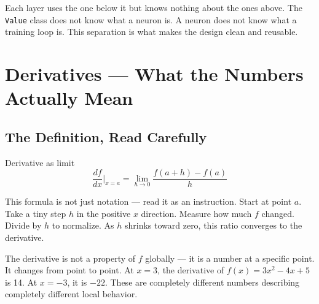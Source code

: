 \documentclass[12pt,a4paper]{article}
\newcommand{\code}[1]{\texttt{\small\color{deepblue}#1}}
\begin{document}
\begin{center}
\end{center}

Each layer uses the one below it but knows nothing about the ones above. The \code{Value} class does not know what a neuron is. A neuron does not know what a training loop is. This separation is what makes the design clean and reusable.

\section{Derivatives — What the Numbers Actually Mean}

\subsection{The Definition, Read Carefully}

\begin{mathbox}{Derivative as limit}
\[
\frac{df}{dx}\bigg|_{x=a} = \lim_{h \to 0} \frac{f(a+h) - f(a)}{h}
\]
\end{mathbox}

This formula is not just notation — read it as an instruction. Start at point $a$. Take a tiny step $h$ in the positive $x$ direction. Measure how much $f$ changed. Divide by $h$ to normalize. As $h$ shrinks toward zero, this ratio converges to the derivative.

The derivative is not a property of $f$ globally — it is a number at a specific point. It changes from point to point. At $x=3$, the derivative of $f(x) = 3x^2 - 4x + 5$ is 14. At $x=-3$, it is $-22$. These are completely different numbers describing completely different local behavior.
\end{document}
